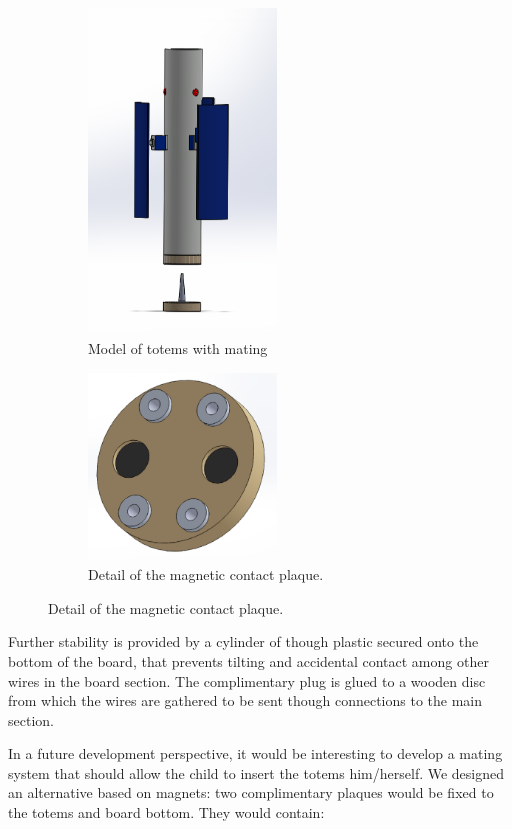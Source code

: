 \documentclass[a4paper,twoside]{book}
\begin{document}
\begin{figure}
    \begin{subfigure}{6cm}
    \includegraphics[width=5cm]{img/totem_nuovo2}
    \captionsetup{width=4cm}
    \caption{Model of totems with mating}
	\end{subfigure}
	\begin{subfigure}{6cm}
    \includegraphics[width=5cm]{img/placca_contatto}
    \captionsetup{width=4cm}
    \caption{Detail of the magnetic contact plaque.}
    \end{subfigure}
\end{figure}

Further stability is provided by a cylinder of though plastic secured onto the bottom of the board, that prevents tilting and accidental contact among other wires in the board section. The complimentary plug is glued to a wooden disc from which the wires are gathered to be sent though connections to the main section.

In a future development perspective, it would be interesting to develop a mating system that should allow the child to insert the totems him/herself. We designed an alternative based on magnets:
two complimentary plaques would be fixed to the totems and board bottom. They would contain:
\end{document}
